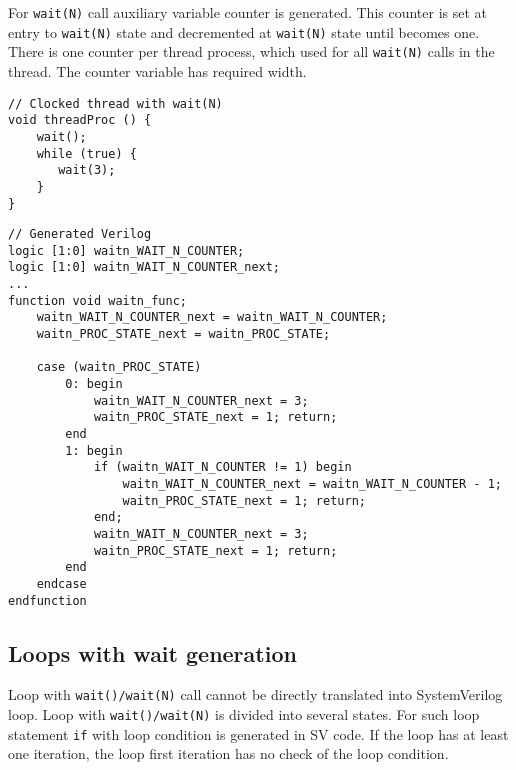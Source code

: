 For {\tt wait(N)} call auxiliary variable counter is generated. This counter is set at entry to {\tt wait(N)} state and decremented at {\tt wait(N)} state until becomes one.
There is one counter per thread process, which used for all {\tt wait(N)} calls in the thread. The counter variable has required width.

\begin{lstlisting}[style=mycpp]
// Clocked thread with wait(N)
void threadProc () {
    wait();
    while (true) {
       wait(3);
    }
}
\end{lstlisting}
%
\begin{lstlisting}[style=myverilog]
// Generated Verilog
logic [1:0] waitn_WAIT_N_COUNTER;
logic [1:0] waitn_WAIT_N_COUNTER_next;
...
function void waitn_func;
    waitn_WAIT_N_COUNTER_next = waitn_WAIT_N_COUNTER;
    waitn_PROC_STATE_next = waitn_PROC_STATE;
    
    case (waitn_PROC_STATE)
        0: begin
            waitn_WAIT_N_COUNTER_next = 3;
            waitn_PROC_STATE_next = 1; return;    
        end
        1: begin
            if (waitn_WAIT_N_COUNTER != 1) begin
                waitn_WAIT_N_COUNTER_next = waitn_WAIT_N_COUNTER - 1;
                waitn_PROC_STATE_next = 1; return;    
            end;
            waitn_WAIT_N_COUNTER_next = 3;
            waitn_PROC_STATE_next = 1; return;    
        end
    endcase
endfunction
\end{lstlisting}

\subsection{Loops with wait generation}\label{section:loop_thread}

Loop with {\tt wait()/wait(N)} call cannot be directly translated into SystemVerilog loop. Loop with {\tt wait()/wait(N)} is divided into several states. For such loop statement {\tt if} with loop condition is generated in SV code. If the loop has at least one iteration, the loop first iteration has no check of the loop condition.

